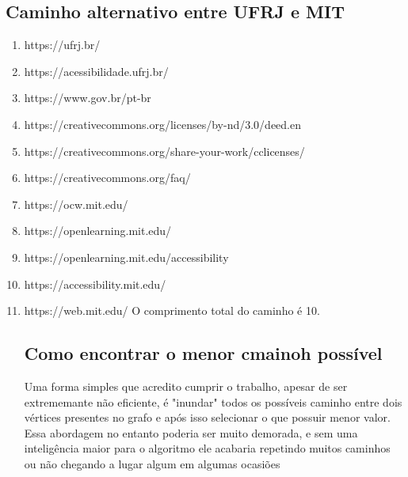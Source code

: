\documentclass{article}
\begin{document}
\subsection{Caminho alternativo entre UFRJ e MIT}
\begin{enumerate}
    \item https://ufrj.br/
    \item https://acessibilidade.ufrj.br/
    \item https://www.gov.br/pt-br
    \item https://creativecommons.org/licenses/by-nd/3.0/deed.en
    \item https://creativecommons.org/share-your-work/cclicenses/
    \item https://creativecommons.org/faq/
    \item https://ocw.mit.edu/
    \item https://openlearning.mit.edu/
    \item https://openlearning.mit.edu/accessibility
    \item https://accessibility.mit.edu/
    \item https://web.mit.edu/
    O comprimento total do caminho é 10.
\subsection{Como encontrar o menor cmainoh possível}
Uma forma simples que acredito cumprir o trabalho, apesar de ser extrememante não eficiente, é "inundar" todos os possíveis caminho entre dois vértices presentes no grafo e após isso selecionar o que possuir menor valor. Essa abordagem no entanto poderia ser muito demorada, e sem uma inteligência maior para o algoritmo ele acabaria repetindo muitos caminhos ou não chegando a lugar algum em algumas ocasiões
\end{enumerate}
\end{document}
